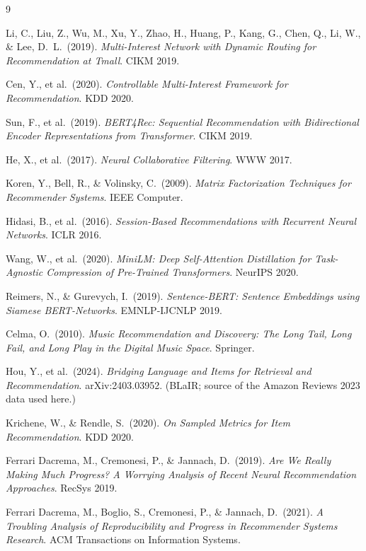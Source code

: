 \documentclass{article}
\begin{document}

\begin{thebibliography}{9}

Li, C., Liu, Z., Wu, M., Xu, Y., Zhao, H., Huang, P., Kang, G., Chen, Q., Li, W., \& Lee, D.\ L.\ (2019).
\textit{Multi-Interest Network with Dynamic Routing for Recommendation at Tmall}. CIKM 2019.

Cen, Y., et al.\ (2020).
\textit{Controllable Multi-Interest Framework for Recommendation}. KDD 2020.

Sun, F., et al.\ (2019).
\textit{BERT4Rec: Sequential Recommendation with Bidirectional Encoder Representations from Transformer}. CIKM 2019.

He, X., et al.\ (2017).
\textit{Neural Collaborative Filtering}. WWW 2017.

Koren, Y., Bell, R., \& Volinsky, C.\ (2009).
\textit{Matrix Factorization Techniques for Recommender Systems}. IEEE Computer.

Hidasi, B., et al.\ (2016).
\textit{Session-Based Recommendations with Recurrent Neural Networks}. ICLR 2016.

Wang, W., et al.\ (2020).
\textit{MiniLM: Deep Self-Attention Distillation for Task-Agnostic Compression of Pre-Trained Transformers}. NeurIPS 2020.

Reimers, N., \& Gurevych, I.\ (2019).
\textit{Sentence-BERT: Sentence Embeddings using Siamese BERT-Networks}. EMNLP-IJCNLP 2019.

Celma, O.\ (2010).
\textit{Music Recommendation and Discovery: The Long Tail, Long Fail, and Long Play in the Digital Music Space}. Springer.

Hou, Y., et al.\ (2024).
\textit{Bridging Language and Items for Retrieval and Recommendation}. arXiv:2403.03952. (BLaIR; source of the Amazon Reviews 2023 data used here.)

Krichene, W., \& Rendle, S.\ (2020).
\textit{On Sampled Metrics for Item Recommendation}. KDD 2020.

Ferrari Dacrema, M., Cremonesi, P., \& Jannach, D.\ (2019).
\textit{Are We Really Making Much Progress? A Worrying Analysis of Recent Neural Recommendation Approaches}. RecSys 2019.

Ferrari Dacrema, M., Boglio, S., Cremonesi, P., \& Jannach, D.\ (2021).
\textit{A Troubling Analysis of Reproducibility and Progress in Recommender Systems Research}. ACM Transactions on Information Systems.


\end{thebibliography}
\end{document}
